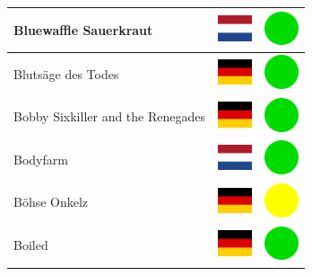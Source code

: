 \documentclass[12pt, a4paper, twoside]{report}
\begin{document}
\begin{center}
\begin{longtable}{|p{5cm}|p{2cm}|p{2cm}|}
 Bluewaffle Sauerkraut                                      & \includegraphics[width=1cm]{../img/flags/nl} &   \includegraphics[width=1cm]{../likes/y} \\ \hline
 Blutsäge des Todes                                         & \includegraphics[width=1cm]{../img/flags/de} &   \includegraphics[width=1cm]{../likes/y} \\ \hline
 Bobby Sixkiller and the Renegades                          & \includegraphics[width=1cm]{../img/flags/de} &   \includegraphics[width=1cm]{../likes/y} \\ \hline
 Bodyfarm                                                   & \includegraphics[width=1cm]{../img/flags/nl} &   \includegraphics[width=1cm]{../likes/y} \\ \hline
 Böhse Onkelz                                               & \includegraphics[width=1cm]{../img/flags/de} &   \includegraphics[width=1cm]{../likes/m} \\ \hline
 Boiled                                                     & \includegraphics[width=1cm]{../img/flags/de} &   \includegraphics[width=1cm]{../likes/y} \\ \hline

\end{longtable}
\end{center}
\end{document}
